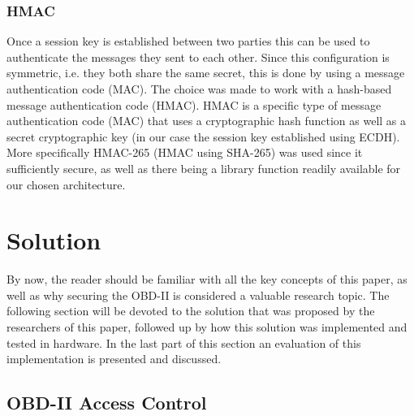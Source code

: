 \documentclass[11pt]{article}
\begin{document}
\subsubsection{HMAC} Once a session key is established between two parties this can be used to authenticate the messages they sent to each other. Since this configuration is symmetric, i.e. they both share the same secret, this is done by using a message authentication code (MAC). The choice was made to work with a hash-based message authentication code (HMAC). HMAC is a specific type of message authentication code (MAC) that uses a cryptographic hash function as well as a secret cryptographic key (in our case the session key established using ECDH). More specifically HMAC-265 (HMAC using SHA-265) was used since it sufficiently secure, as well as there being a library function readily available for our chosen architecture.


\section{Solution}
\label{sec:solution}

By now, the reader should be familiar with all the key concepts of this paper, as well as why securing the OBD-II is considered a valuable research topic. The following section will be devoted to the solution that was proposed by the researchers of this paper, followed up by how this solution was implemented and tested in hardware. In the last part of this section an evaluation of this implementation is presented and discussed. 

\subsection{OBD-II Access Control}
\label{sec:OBD-II_access_control}
\end{document}
